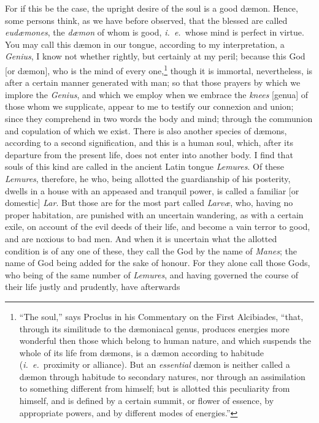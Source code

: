 \documentclass[12pt]{article}
\begin{document}
\noindent For if this be the case, the upright desire of the soul is a good
d{\ae}mon. Hence, some persons think, as we have before observed, that the
blessed are called \textit{eud{\ae}mones}, the \textit{d{\ae}mon} of whom is
good, \textit{i.~e.}~whose mind is perfect in virtue. You may call this
d{\ae}mon in our tongue, according to my interpretation, a \textit{Genius}, I
know not whether rightly, but certainly at my peril; because this God [or
d{\ae}mon], who is the mind of every one,\footnote{``The soul,'' says Proclus
in his Commentary on the First Alcibiades, ``that, through its
similitude to the d{\ae}moniacal genus, produces energies more wonderful then
those which belong to human nature, and which suspends the whole of its life
from d{\ae}mons, is a d{\ae}mon according to habitude (\textit{i.~e.}~proximity
or alliance). But an \textit{essential} d{\ae}mon is neither called a d{\ae}mon
through habitude to secondary natures, nor through an assimilation to something
different from himself; but is allotted this peculiarity from himself, and is
defined by a certain summit, or flower of essence, by appropriate powers, and
by different modes of energies.''} though it is immortal, nevertheless, is
after a certain manner generated with man; so that those prayers by which we
implore the \textit{Genius}, and which we employ when we embrace the
\textit{knees} [genua] of those whom we supplicate, appear to me to testify our
connexion and union; since they comprehend in two words the body and mind;
through the communion and copulation of which we exist. There is also another
species of d{\ae}mons, according to a second signification, and this is a human
soul, which, after its departure from the present life, does not enter into
another body. I find that souls of this kind are called in the ancient Latin
tongue \textit{Lemures}. Of these \textit{Lemures}, therefore, he who, being
allotted the guardianship of his posterity, dwells in a house with an appeased
and tranquil power, is called a familiar [or domestic] \textit{Lar}. But those
are for the most part called \textit{Larv{\ae}}, who, having no proper
habitation, are punished with an uncertain wandering, as with a certain exile,
on account of the evil deeds of their life, and become a vain terror to good,
and are noxious to bad men. And when it is uncertain what the allotted
condition is of any one of these, they call the God by the name of
\textit{Manes}; the name of God being added for the sake of honour. For they
alone call those Gods, who being of the same number of \textit{Lemures}, and
having governed the course of their life justly and prudently, have afterwards
\end{document}
